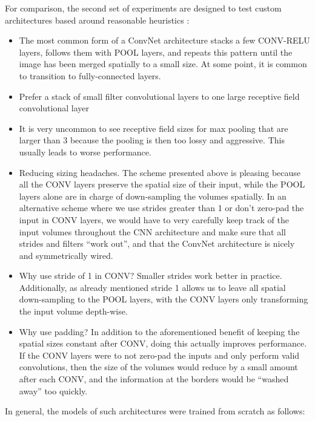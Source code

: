 For comparison, the second set of experiments are designed to test custom architectures based around reasonable heuristics \cite{cs231n}:

\begin{itemize}
    \item The most common form of a ConvNet architecture stacks a few CONV-RELU layers, follows them with POOL layers, and repeats this pattern until the image has been merged spatially to a small size. At some point, it is common to transition to fully-connected layers.
    \item Prefer a stack of small filter convolutional layers to one large receptive field convolutional layer
    \item It is very uncommon to see receptive field sizes for max pooling that are larger than 3 because the pooling is then too lossy and aggressive. This usually leads to worse performance.
    \item Reducing sizing headaches. The scheme presented above is pleasing because all the CONV layers preserve the spatial size of their input, while the POOL layers alone are in charge of down-sampling the volumes spatially. In an alternative scheme where we use strides greater than 1 or don’t zero-pad the input in CONV layers, we would have to very carefully keep track of the input volumes throughout the CNN architecture and make sure that all strides and filters “work out”, and that the ConvNet architecture is nicely and symmetrically wired.
    \item Why use stride of 1 in CONV? Smaller strides work better in practice. Additionally, as already mentioned stride 1 allows us to leave all spatial down-sampling to the POOL layers, with the CONV layers only transforming the input volume depth-wise.
    \item Why use padding? In addition to the aforementioned benefit of keeping the spatial sizes constant after CONV, doing this actually improves performance. If the CONV layers were to not zero-pad the inputs and only perform valid convolutions, then the size of the volumes would reduce by a small amount after each CONV, and the information at the borders would be “washed away” too quickly.
\end{itemize}

In general, the models of such architectures were trained from scratch as follows:

